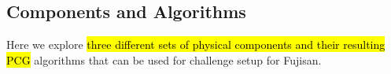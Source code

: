 \documentclass[journal]{IEEEtran}
\begin{document}






\subsection{Components and Algorithms}
\label{section:pcgalgs}
\noindent
Here we explore \hl{three different sets of physical components and their resulting PCG} algorithms that can be used for challenge setup for Fujisan. 
\end{document}
